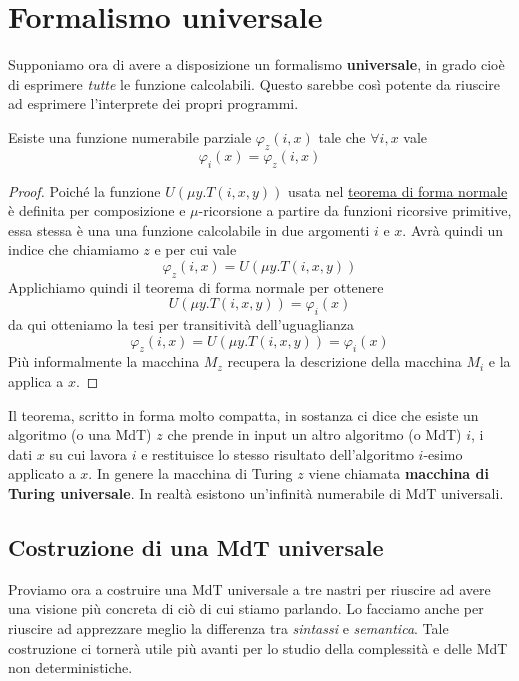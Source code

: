 \section{Formalismo universale}
Supponiamo ora di avere a disposizione un formalismo
\textbf{universale}, in grado cioè di esprimere \emph{tutte}
le funzione calcolabili. Questo sarebbe così potente da
riuscire ad esprimere l'interprete dei propri programmi.

\begin{theorem}[Enumerazione] \label{th: enum}
	Esiste una funzione numerabile parziale $\varphi_z(i, x)$
	tale che $\forall i,x$ vale
	\[ \varphi_i(x) = \varphi_z (i, x) \]
	\begin{proof}
		Poiché la funzione $U(\mu y . T(i, x, y))$ usata nel
		\hyperref[th: fn]{teorema di forma normale} è definita
		per composizione e $\mu$-ricorsione a partire da
		funzioni ricorsive primitive, essa stessa è una una
		funzione calcolabile in due argomenti $i$ e $x$. Avrà
		quindi un indice che chiamiamo $z$ e per cui vale
		\[ \varphi_z (i, x) = U(\mu y. T(i, x, y)) \]
		Applichiamo quindi il teorema di forma normale per
		ottenere
		\[ U(\mu y . T(i, x, y)) = \varphi_i (x) \]
		da qui otteniamo la tesi per transitività
		dell'uguaglianza
		\[
			\varphi_z (i, x) = U(\mu y . T(i, x, y)) =
			\varphi_i (x)
		\]
		Più informalmente la macchina $M_z$ recupera la
		descrizione della macchina $M_i$ e la applica a $x$.
	\end{proof}
\end{theorem}

Il teorema, scritto in forma molto compatta, in sostanza ci
dice che esiste un algoritmo (o una MdT) $z$ che prende in
input un altro algoritmo (o MdT) $i$, i dati $x$ su cui lavora
$i$ e restituisce lo stesso risultato dell'algoritmo $i$-esimo
applicato a $x$. In genere la macchina di Turing $z$ viene
chiamata \textbf{macchina di Turing universale}. In realtà
esistono un'infinità numerabile di MdT universali.

\subsection{Costruzione di una MdT universale}
Proviamo ora a costruire una MdT universale a tre nastri per
riuscire ad avere una visione più concreta di ciò di cui stiamo
parlando. Lo facciamo anche per riuscire ad apprezzare meglio la
differenza tra \emph{sintassi} e \emph{semantica}. Tale
costruzione ci tornerà utile più avanti per lo studio della
complessità e delle MdT non deterministiche.

